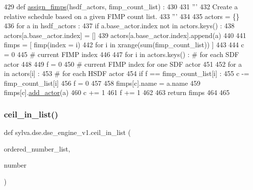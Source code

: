 \begin{DoxyCode}
429 \textcolor{keyword}{def }\hyperlink{namespacesylva_1_1dse_1_1dse__engine__v1_ac7bc9055c7171c3d5156f342722248fc}{assign\_fimps}(hsdf\_actors, fimp\_count\_list) :
430 
431   \textcolor{stringliteral}{'''}
432 \textcolor{stringliteral}{    Create a relative schedule based on a given FIMP count list.}
433 \textcolor{stringliteral}{  '''}
434 
435   actors = \{\}
436   \textcolor{keywordflow}{for} a \textcolor{keywordflow}{in} hsdf\_actors :
437     \textcolor{keywordflow}{if} a.base\_actor.index \textcolor{keywordflow}{not} \textcolor{keywordflow}{in} actors.keys() :
438       actors[a.base\_actor.index] = []
439     actors[a.base\_actor.index].append(a)
440 
441   fimps = [ fimp(index = i)
442             \textcolor{keywordflow}{for} i \textcolor{keywordflow}{in} xrange(sum(fimp\_count\_list)) ]
443 
444   c = 0
445   \textcolor{comment}{# current FIMP index}
446 
447   \textcolor{keywordflow}{for} i \textcolor{keywordflow}{in} actors.keys() : \textcolor{comment}{# for each SDF actor}
448 
449     f = 0
450     \textcolor{comment}{# current FIMP index for one SDF actor}
451 
452     \textcolor{keywordflow}{for} a \textcolor{keywordflow}{in} actors[i] :
453     \textcolor{comment}{# for each HSDF actor}
454       \textcolor{keywordflow}{if} f == fimp\_count\_list[i] :
455         c -= fimp\_count\_list[i]
456         f = 0
457 
458       fimps[c].name = a.name
459       fimps[c].\hyperlink{namespacesylva_1_1base_1_1sdf_a2fc075a9dc81209dee7a5b97d99640e5}{add\_actor}(a)
460       c += 1
461       f += 1
462 
463   \textcolor{keywordflow}{return} fimps
464 
465 \end{DoxyCode}
\mbox{\label{namespacesylva_1_1dse_1_1dse__engine__v1_af190117e4402a059bd348c6909abada2}} 
\subsubsection{\texorpdfstring{ceil\+\_\+in\+\_\+list()}{ceil\_in\_list()}}
{\footnotesize\ttfamily def sylva.\+dse.\+dse\+\_\+engine\+\_\+v1.\+ceil\+\_\+in\+\_\+list (\begin{DoxyParamCaption}\item[{}]{ordered\+\_\+number\+\_\+list,  }\item[{}]{number }\end{DoxyParamCaption})}

